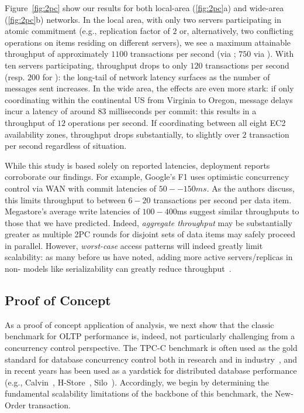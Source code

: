 Figure~\ref{fig:2pc} show our results for both local-area
(\ref{fig:2pc}a) and wide-area (\ref{fig:2pc}b) networks.  In the
local area, with only two servers participating in atomic commitment
(e.g., replication factor of $2$ or, alternatively, two conflicting
operations on items residing on different servers), we see a maximum
attainable throughput of approximately $1100$ transactions per second
(via \dpc; $750$ via \cpc). With ten servers participating, \dpc
throughput drops to only $120$ transactions per second (resp. $200$
for \cpc): the long-tail of network latency surfaces as the number of
messages sent increases. In the wide area, the effects are even more
stark: if only coordinating within the continental US from Virginia to
Oregon, \dpc message delays incur a latency of around $83$
milliseconds per commit: this results in a throughput of $12$
operations per second. If coordinating between all eight EC2
availability zones, throughput drops substantially, to slightly over
$2$ transaction per second regardless of situation.

While this study is based solely on reported latencies, deployment
reports corroborate our findings. For example, Google's F1 uses
optimistic concurrency control via WAN with commit latencies of
$50--150ms$. As the authors discuss, this limits throughput to between
$6-20$ transactions per second per data item. Megastore's average
write latencies of $100-400$ms suggest similar throughputs to those
that we have predicted. Indeed, \textit{aggregate throughput} may be
substantially greater as multiple 2PC rounds for disjoint sets of data
items may safely proceed in parallel. However, \textit{worst-case}
access patterns will indeed greatly limit scalability: as many before
us have noted, adding more active servers/replicas in non-\cfree
models like serializability can greatly reduce
throughput~\cite{abadi-vll,calvin,jones-dtxn}.

\subsection{Proof of Concept}

As a proof of concept application of \cfreedom analysis, we next show
that the classic benchmark for OLTP performance is, indeed, not
particularly challenging from a concurrency control perspective. The
TPC-C benchmark is often used as the gold standard for database
concurrency control both in research and in industry~\cite{tpcc}, and
in recent years has been used as a yardstick for distributed database
performance (e.g., Calvin~\cite{calvin}, H-Store~\cite{hstore},
Silo~\cite{silo}). Accordingly, we begin by determining the
fundamental scalability limitations of the backbone of this benchmark,
the New-Order transaction.

